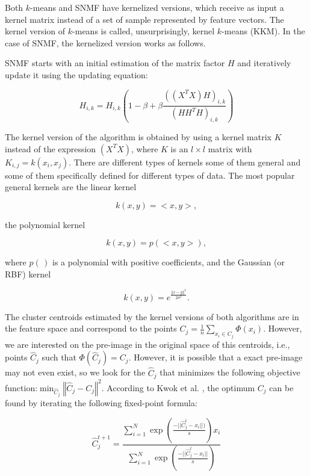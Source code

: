 \documentclass[letterpaper,12pt]{article}
\begin{document}
Both $k$-means and SNMF have kernelized versions, which receive as input a kernel matrix instead of a set of sample represented by feature vectors. The kernel version of $k$-means is called, unsurprisingly, kernel $k$-means (KKM). In the case of SNMF, the kernelized version works as follows.

SNMF starts with an initial estimation of the matrix factor $H$ and iteratively update it using the updating equation:

\[
H_{i,k}=H_{i,k}(1-\beta+\beta\frac{((X^{T}X)H)_{i,k}}{(HH^{T}H)_{i,k}})
\]


The kernel version of the algorithm is obtained by using a kernel matrix $K$ instead of the expression $(X^{T}X)$, where $K$ is an
$l\times l$ matrix with $K_{i,j}=k(x_{i},x_{j}).$ There are different types of kernels some of them general and some of them specifically defined for different types of data. The most popular general kernels are the linear kernel 

\begin{equation}
k(x,y)=<x,y>,\label{eq:id-kernel}
\end{equation}

 the polynomial kernel 
 
\[
k(x,y)=p(<x,y>),
\]

 where $p(\,)$ is a polynomial with positive coefficients, and the Gaussian (or RBF) kernel 
 
\begin{equation}
k(x,y)=e^{\frac{\left\Vert x-y\right\Vert ^{2}}{2\sigma^{2}}}.\label{eq:Gaussian-kernel}
\end{equation}


The cluster centroids estimated by the kernel versions of both algorithms are in the feature space and correspond to the points $C_{j}=\frac{1}{n}\sum_{x_{i}\in C_{j}}\Phi(x_{i})$. However, we are interested on the pre-image in the original space of this centroids, i.e., points $\hat{C}_{j}$ such that $\Phi(\hat{C}_{j})=C_{j}$. However, it is possible that a exact pre-image may not even exist, so we look for the $\hat{C}_{j}$ that minimizes the following objective function:$\min_{\hat{C}_{j}}\left\Vert \hat{C}_{j}-C_{j}\right\Vert ^{2}$. According to Kwok et al. \cite{kwok2004preimage}, the optimum $C_{j}$ can be found by iterating the following fixed-point formula:

\begin{equation}
\hat{C}_{j}^{t+1}=\frac{\sum_{i=1}^{N}\exp(\frac{-||\hat{C}_{j}^{t}-x_{i}||)}{s})x_{i}}{\sum_{i=1}^{N}\exp(\frac{-||\hat{C}_{j}^{t}-x_{i}||}{s})}\label{eq:back-projection}
\end{equation}
\end{document}
